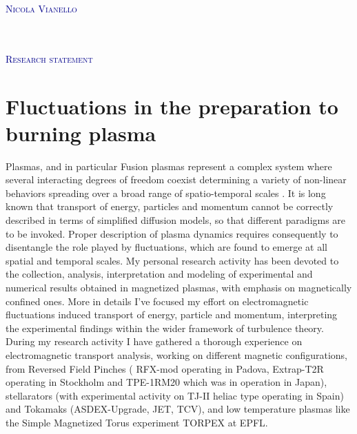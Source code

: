 \documentclass[12pt,a4paper]{article}
\begin{document}
\begin{flushright}
\textcolor{darkBlue}{ \Huge
\lettrine[lines=3,findent=-1pt, loversize = -0.42,
lraise=0.6]{N}{icola Vianello}}\\[2pt]
\textcolor{Gray}{}\\
\textcolor{Gray}{}\\
\textcolor{Gray}{}
\end{flushright}
\begin{flushleft} 
\textcolor{darkBlue}{ \Huge
\lettrine[lines=2,findent=-1pt, loversize = -0.42,
lraise=0.6]{R}{esearch statement}} 
\end{flushleft}


\section*{Fluctuations in the preparation to burning plasma}
Plasmas, and in particular Fusion plasmas represent a complex system
where several interacting degrees of freedom coexist determining a
variety of non-linear behaviors spreading over a broad range of
spatio-temporal scales
\cite{Kadomtsev:1992us,Sornette:2006dt}. It is long known that 
transport of energy, particles and momentum cannot be correctly
described in terms of simplified diffusion models, so that different
paradigms are to be invoked. Proper description of plasma
dynamics requires consequently to disentangle the role played by
fluctuations, which are found to emerge at all spatial and temporal
scales. My personal research activity has been devoted to the collection, analysis,
interpretation and modeling of experimental and numerical results
obtained in magnetized plasmas, with emphasis
on magnetically confined ones. More in details I've focused my effort
on electromagnetic fluctuations induced transport of energy, particle
and momentum, interpreting the experimental findings within the wider framework of turbulence
theory. During my research activity I have gathered a thorough 
experience on electromagnetic transport analysis, working on different
magnetic configurations, from Reversed Field Pinches (
RFX-mod operating in Padova, Extrap-T2R operating in Stockholm and
TPE-1RM20 which was in operation in Japan), stellarators (with
experimental activity on TJ-II heliac type operating in Spain) and Tokamaks
(ASDEX-Upgrade, JET, TCV), and low temperature plasmas like the Simple
Magnetized Torus experiment TORPEX at EPFL. 
\end{document}
